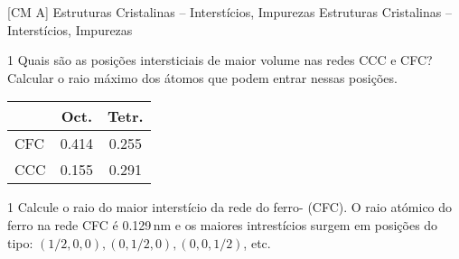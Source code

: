 \documentclass[\mainfilename]{subfiles}
\begin{document}

[CM A]
{Estruturas Cristalinas -- Interstícios, Impurezas} %
{Estruturas Cristalinas -- Interstícios, Impurezas} %

\setcounter{question}{11}

\begin{questionBox}1{ %
    Quais são as posições intersticiais de maior volume nas redes CCC e CFC? Calcular o raio máximo dos átomos que podem entrar nessas posições.
} %
    \answer{}
    \begin{center}
        \vspace{1ex}
        \begin{tabular}{l c c}
            \toprule
            
                & Oct. & Tetr.
            
            \\\midrule
            
                CFC & 0.414 & 0.255
                \\
                CCC & 0.155 & 0.291
            
            \\\bottomrule
        \end{tabular}
        \vspace{2ex}
    \end{center}
\end{questionBox}

\begin{questionBox}1{ %
    Calcule o raio do maior interstício da rede do ferro-\chemgamma{} (CFC). O raio atómico do ferro na rede CFC é 0.129\,\si{\nano\metre} e os maiores intrestícios surgem em posições do tipo:
    \((1/2,0,0),(0,1/2,0),(0,0,1/2)\), etc.
} %
\end{questionBox}
\end{document}
